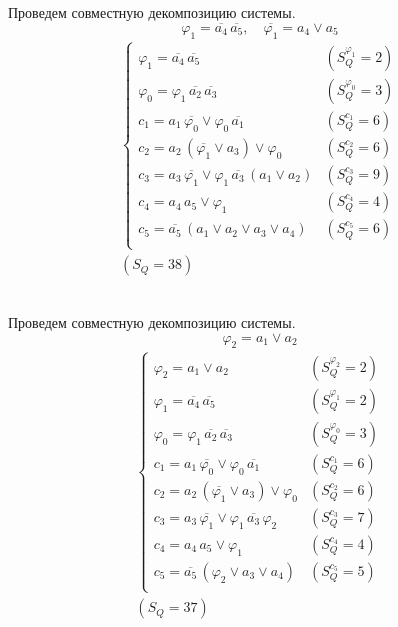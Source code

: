 \documentclass{article}
\begin{document}
\noindent\begin{minipage}{\textwidth}
Проведем совместную декомпозицию системы. \[\varphi_{1} = \overline{a_4}\,\overline{a_5}, \quad \overline{\varphi_{1}} = a_4 \lor a_5\]
\[\begin{matrix}
    \begin{cases}
        \varphi_{1} = \overline{a_4}\,\overline{a_5} & (S_Q^{\varphi_{1}} = 2) \\
        \varphi_{0} = \varphi_{1}\,\overline{a_2}\,\overline{a_3} & (S_Q^{\varphi_{0}} = 3) \\
        c_1 = a_1\,\overline{\varphi_{0}} \lor \varphi_{0}\,\overline{a_1} & (S_Q^{c_1} = 6) \\
        c_2 = a_2\,\left(\overline{\varphi_{1}} \lor a_3\right) \lor \varphi_{0} & (S_Q^{c_2} = 6) \\
        c_3 = a_3\,\overline{\varphi_{1}} \lor \varphi_{1}\,\overline{a_3}\,\left(a_1 \lor a_2\right) & (S_Q^{c_3} = 9) \\
        c_4 = a_4\,a_5 \lor \varphi_{1} & (S_Q^{c_4} = 4) \\
        c_5 = \overline{a_5}\,\left(a_1 \lor a_2 \lor a_3 \lor a_4\right) & (S_Q^{c_5} = 6) \\
    \end{cases} \\ (S_Q = 38)
\end{matrix}\] \\ \phantom{0}
\end{minipage}
\noindent\begin{minipage}{\textwidth}
Проведем совместную декомпозицию системы. \[\varphi_{2} = a_1 \lor a_2\]
\[\begin{matrix}
    \begin{cases}
        \varphi_{2} = a_1 \lor a_2 & (S_Q^{\varphi_{2}} = 2) \\
        \varphi_{1} = \overline{a_4}\,\overline{a_5} & (S_Q^{\varphi_{1}} = 2) \\
        \varphi_{0} = \varphi_{1}\,\overline{a_2}\,\overline{a_3} & (S_Q^{\varphi_{0}} = 3) \\
        c_1 = a_1\,\overline{\varphi_{0}} \lor \varphi_{0}\,\overline{a_1} & (S_Q^{c_1} = 6) \\
        c_2 = a_2\,\left(\overline{\varphi_{1}} \lor a_3\right) \lor \varphi_{0} & (S_Q^{c_2} = 6) \\
        c_3 = a_3\,\overline{\varphi_{1}} \lor \varphi_{1}\,\overline{a_3}\,\varphi_{2} & (S_Q^{c_3} = 7) \\
        c_4 = a_4\,a_5 \lor \varphi_{1} & (S_Q^{c_4} = 4) \\
        c_5 = \overline{a_5}\,\left(\varphi_{2} \lor a_3 \lor a_4\right) & (S_Q^{c_5} = 5) \\
    \end{cases} \\ (S_Q = 37)
\end{matrix}\] \\ \phantom{0}
\end{minipage}
\end{document}
